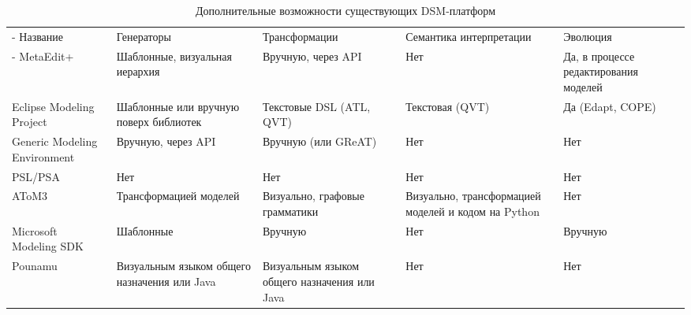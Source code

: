 \begin{table}[ht]
\begin{small}
	\begin{longtabu} {| X[1 l p] | X[1 l p] | X[1 l p] | X[1 l p] | X[1 l p] |}
		\caption{Дополнительные возможности существующих DSM-платформ} \\
		\tabucline-
		 Название                    & Генераторы                                             & Трансформации                                 & Семантика интерпретации                             & Эволюция                                                      \\
		\tabucline-
		\everyrow{\tabucline-}
		MetaEdit+                    & Шаблонные, визуальная иерархия                         & Вручную, через API                            & Нет                                                 & Да, в процессе редактирования моделей                         \\
		Eclipse Modeling Project     & Шаблонные или вручную поверх библиотек                 & Текстовые DSL (ATL, QVT)                      & Текстовая (QVT)                                     & Да (Edapt, COPE)                                              \\
		Generic Modeling Environment & Вручную, через API                                     & Вручную (или GReAT)                           & Нет                                                 & Нет                                                           \\
		PSL/PSA                      & Нет                                                    & Нет                                           & Нет                                                 & Нет                                                           \\
		AToM3                        & Трансформацией моделей                                 & Визуально, графовые грамматики                & Визуально, трансформацией моделей и кодом на Python & Нет                                                           \\
		Microsoft Modeling SDK       & Шаблонные                                              & Вручную                                       & Нет                                                 & Вручную                                                       \\
		Pounamu                      & Визуальным языком общего назначения или Java           & Визуальным языком общего назначения или Java  & Нет                                                 & Нет                                                           \\

\end{longtabu}
\end{small}
\end{table}
